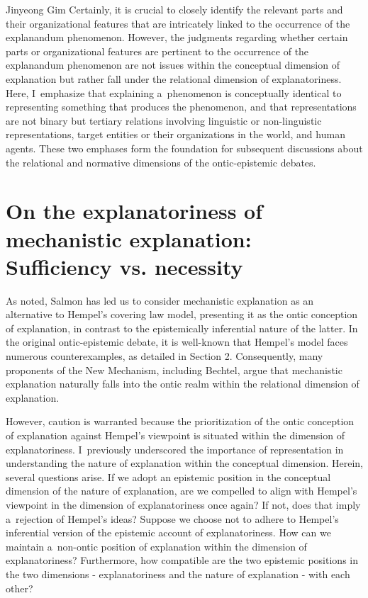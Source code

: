 \begin{artengenv}{Jinyeong Gim}
Certainly, it is crucial to closely identify the relevant parts and their organizational features that are intricately linked to the occurrence of the explanandum phenomenon. However, the judgments regarding whether certain parts or organizational features are pertinent to the occurrence of the explanandum phenomenon are not issues within the conceptual dimension of explanation but rather fall under the relational dimension of explanatoriness. Here, I~emphasize that explaining a~phenomenon is conceptually identical to representing something that produces the phenomenon, and that representations are not binary but tertiary relations involving linguistic or non-linguistic representations, target entities or their organizations in the world, and human agents. These two emphases form the foundation for subsequent discussions about the relational and normative dimensions of the ontic-epistemic debates.

\section{On the explanatoriness of mechanistic explanation: Sufficiency vs. necessity}
As noted, Salmon has led us to consider mechanistic explanation as an alternative to Hempel's covering law model, presenting it as the ontic conception of explanation, in contrast to the epistemically inferential nature of the latter. In the original ontic-epistemic debate, it is well-known that Hempel's model faces numerous counterexamples, as detailed in Section 2. Consequently, many proponents of the New Mechanism, including Bechtel, argue that mechanistic explanation naturally falls into the ontic realm within the relational dimension of explanation.

However, caution is warranted because the prioritization of the ontic conception of explanation against Hempel's viewpoint is situated within the dimension of explanatoriness. I~previously underscored the importance of representation in understanding the nature of explanation within the conceptual dimension. Herein, several questions arise. If we adopt an epistemic position in the conceptual dimension of the nature of explanation, are we compelled to align with Hempel's viewpoint in the dimension of explanatoriness once again? If not, does that imply a~rejection of Hempel's ideas? Suppose we choose not to adhere to Hempel's inferential version of the epistemic account of explanatoriness. How can we maintain a~non-ontic position of explanation within the dimension of explanatoriness? Furthermore, how compatible are the two epistemic positions in the two dimensions - explanatoriness and the nature of explanation - with each other?


\end{artengenv}
